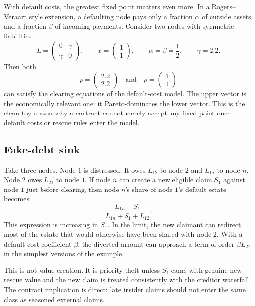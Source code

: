\documentclass[11pt,oneside]{article}
\begin{document}
With default costs, the greatest fixed point matters even more. In a
Rogers--Veraart style extension, a defaulting node pays only a fraction
$\alpha$ of outside assets and a fraction $\beta$ of incoming payments. Consider
two nodes with symmetric liabilities
\[
  L=
  \begin{pmatrix}
    0 & \gamma\\
    \gamma & 0
  \end{pmatrix},
  \qquad
  x=
  \begin{pmatrix}
    1\\
    1
  \end{pmatrix},
  \qquad
  \alpha=\beta=\frac12,
  \qquad
  \gamma=2.2.
\]
Then both
\[
  p=
  \begin{pmatrix}
    2.2\\
    2.2
  \end{pmatrix}
  \quad\text{and}\quad
  p=
  \begin{pmatrix}
    1\\
    1
  \end{pmatrix}
\]
can satisfy the clearing equations of the default-cost model. The upper vector
is the economically relevant one: it Pareto-dominates the lower vector. This is
the clean toy reason why a contract cannot merely accept any fixed point once
default costs or rescue rules enter the model.

\subsection{Fake-debt sink}

Take three nodes. Node $1$ is distressed. It owes $L_{12}$ to node $2$ and
$L_{1n}$ to node $n$. Node $2$ owes $L_{21}$ to node $1$. If node $n$ can create
a new eligible claim $S_1$ against node $1$ just before clearing, then node
$n$'s share of node $1$'s default estate becomes
\[
  \frac{L_{1n}+S_1}{L_{1n}+S_1+L_{12}}.
\]
This expression is increasing in $S_1$. In the limit, the new claimant can
redirect most of the estate that would otherwise have been shared with node
$2$. With a default-cost coefficient $\beta$, the diverted amount can approach
a term of order $\beta L_{21}$ in the simplest versions of the example.

This is not value creation. It is priority theft unless $S_1$ came with genuine
new rescue value and the new claim is treated consistently with the creditor
waterfall. The contract implication is direct: late insider claims should not
enter the same class as seasoned external claims.
\end{document}
